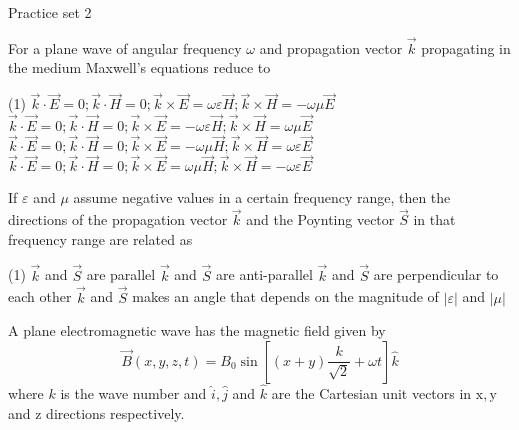        
       
       
       
       
 
 
 \newpage
 \begin{abox}
 	Practice set 2 
 	\end{abox}
 \begin{enumerate}
 	\begin{minipage}{\textwidth}
 		\item For a plane wave of angular frequency $\omega$ and propagation vector $\vec{k}$ propagating in the medium Maxwell's equations reduce to
 	\end{minipage}
 	\begin{tasks}(1)
 		\task[\textbf{A.}] $\vec{k} \cdot \vec{E}=0 ; \vec{k} \cdot \vec{H}=0 ; \vec{k} \times \vec{E}=\omega \varepsilon \vec{H} ; \vec{k} \times \vec{H}=-\omega \mu \vec{E}$ 
 		\task[\textbf{B.}]$\vec{k} \cdot \vec{E}=0 ; \vec{k} \cdot \vec{H}=0 ; \vec{k} \times \vec{E}=-\omega \varepsilon \vec{H} ; \vec{k} \times \vec{H}=\omega \mu \vec{E}$
 		\task[\textbf{C.}]$\vec{k} \cdot \vec{E}=0 ; \vec{k} \cdot \vec{H}=0 ; \vec{k} \times \vec{E}=-\omega \mu \vec{H} ; \vec{k} \times \vec{H}=\omega \varepsilon \vec{E}$
 		\task[\textbf{D.}]$\vec{k} \cdot \vec{E}=0 ; \vec{k} \cdot \vec{H}=0 ; \vec{k} \times \vec{E}=\omega \mu \vec{H} ; \vec{k} \times \vec{H}=-\omega \varepsilon \vec{E}$
 	\end{tasks}
 \begin{minipage}{\textwidth}
 	\item If $\varepsilon$ and $\mu$ assume negative values in a certain frequency range, then the directions of the propagation vector $\vec{k}$ and the Poynting vector $\vec{S}$ in that frequency range are related as
 \end{minipage}
 \begin{tasks}(1)
 	\task[\textbf{A.}] $\vec{k}$ and $\vec{S}$ are parallel
 	\task[\textbf{B.}]$\vec{k}$ and $\vec{S}$ are anti-parallel
 	\task[\textbf{C.}]$\vec{k}$ and $\vec{S}$ are perpendicular to each other
 	\task[\textbf{D.}]$\vec{k}$ and $\vec{S}$ makes an angle that depends on the magnitude of $|\varepsilon|$ and $|\mu|$
 \end{tasks}
\begin{minipage}{\textwidth}
	\item A plane electromagnetic wave has the magnetic field given by
	$$
	\vec{B}(x, y, z, t)=B_{0} \sin \left[(x+y) \frac{k}{\sqrt{2}}+\omega t\right] \hat{k}
	$$
	where $k$ is the wave number and $\hat{i}, \hat{j}$ and $\hat{k}$ are the Cartesian unit vectors in $\mathrm{x}, \mathrm{y}$ and $\mathrm{z}$ directions respectively.

\end{minipage}
\end{enumerate}

